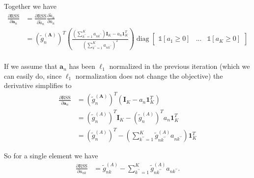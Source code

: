 \documentclass[oneside]{article}
\begin{document}
Together we have
\begin{equation}
    \begin{aligned}
        \frac{\partial \text{RSS}}{\partial \mathbf{a}_{n}} &= \frac{\partial \text{RSS}}{\partial \tilde{a}_n} \frac{\partial  \tilde{a}_n}{\partial a_n} \\
        &= \left( \tilde{g}^{(\mathbf{A})}_n \right)^T \left( \frac{\left( \sum_{k^{\prime \prime}=1}^K a_{nk^{\prime \prime}} \right) \mathbf{I}_K - a_n \mathbf{1}_K^T}{\left( \sum_{k^{\prime \prime}=1}^K a_{nk^{\prime \prime}} \right)^2} \right)
        \operatorname{diag} \begin{bmatrix} \mathds{1} \left[ a_1 \geq 0 \right] & ... & \mathds{1} \left[ a_K \geq 0 \right] \end{bmatrix}
        \\
    \end{aligned}
\end{equation}

If we assume that $\mathbf{a}_{n}$ has been $\ell_1$ normalized in the previous iteration (which we can easily do, since $\ell_1$ normalization does not change the objective) the derivative simplifies to
\begin{equation}
    \begin{aligned}
        \frac{\partial \text{RSS}}{\partial \mathbf{a}_{n}}
        &= \left( \tilde{g}^{(\mathbf{A})}_n \right)^T \left( \mathbf{I}_K - a_n \mathbf{1}_K^T \right) \\
        &= \left( \tilde{g}^{(A)}_n \right)^T \mathbf{I}_K - \left( \tilde{g}^{(A)}_n \right)^T a_n \mathbf{1}_K^T \\
        &= \left( \tilde{g}^{(A)}_n \right)^T - \left( \sum_{k^{\prime \prime}=1}^K  \tilde{g}^{(A)}_{n k^{\prime \prime}} a_{nk^{\prime \prime}} \right) \mathbf{1}_K^T
    \end{aligned}
\end{equation}

So for a single element we have
\begin{equation}
    \begin{aligned}
        \frac{\partial \text{RSS}}{\partial a_{nk}}
        &= \tilde{g}^{(A)}_{nk} - \sum_{k^{\prime \prime}=1}^K  \tilde{g}^{(A)}_{n k^{\prime \prime}} a_{nk^{\prime \prime}}.
    \end{aligned}
\end{equation}
\end{document}
